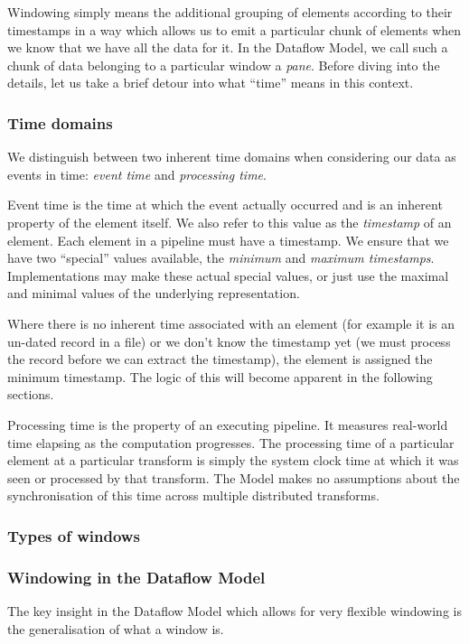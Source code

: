 Windowing simply means the additional grouping of elements according to their timestamps in a way which allows us to emit a particular chunk of elements when we know that we have all the data for it.
In the Dataflow Model, we call such a chunk of data belonging to a particular window a \emph{pane}.
Before diving into the details, let us take a brief detour into what ``time'' means in this context.

\subsubsection{Time domains}
We distinguish between two inherent time domains when considering our data as events in time: \emph{event time} and \emph{processing time}.

Event time is the time at which the event actually occurred and is an inherent property of the element itself.
We also refer to this value as the \emph{timestamp} of an element.
Each element in a pipeline must have a timestamp.
We ensure that we have two ``special'' values available, the \emph{minimum} and \emph{maximum timestamps}.
Implementations may make these actual special values, or just use the maximal and minimal values of the underlying representation.

Where there is no inherent time associated with an element (for example it is an un-dated record in a file) or we don't know the timestamp yet (we must process the record before we can extract the timestamp), the element is assigned the minimum timestamp.
The logic of this will become apparent in the following sections.

Processing time is the property of an executing pipeline.
It measures real-world time elapsing as the computation progresses.
The processing time of a particular element at a particular transform is simply the system clock time at which it was seen or processed by that transform.
The Model makes no assumptions about the synchronisation of this time across multiple distributed transforms.

\subsubsection{Types of windows}



\subsubsection{Windowing in the Dataflow Model}
The key insight in the Dataflow Model which allows for very flexible windowing is the generalisation of what a window is.

